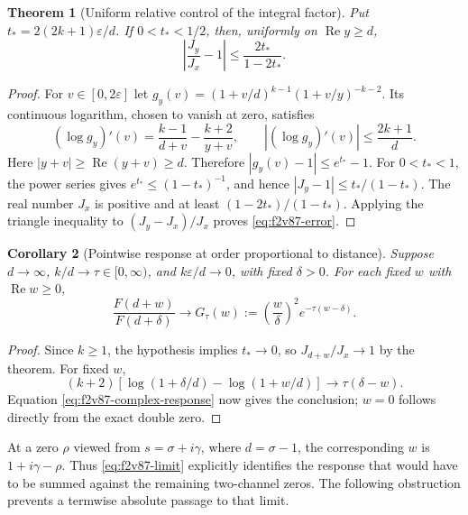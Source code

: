 \documentclass[11pt]{article}
\newtheorem{theorem}{Theorem}[section]
\newtheorem{corollary}[theorem]{Corollary}
\theoremstyle{definition}
\theoremstyle{remark}
\begin{document}
\begin{theorem}[Uniform relative control of the integral factor]
\label{thm:f2v87-uniform}
Put \(t_*=2(2k+1)\varepsilon/d\).  If \(0<t_*<1/2\), then,
uniformly on \(\operatorname{Re}y\ge d\),
\begin{equation}
 \left|\frac{J_y}{J_x}-1\right|
 \le\frac{2t_*}{1-2t_*}.
 \label{eq:f2v87-error}
\end{equation}
\end{theorem}

\begin{proof}
For \(v\in[0,2\varepsilon]\) let
\(g_y(v)=(1+v/d)^{k-1}(1+v/y)^{-k-2}\).  Its continuous logarithm,
chosen to vanish at zero, satisfies
\[
 (\log g_y)'(v)=\frac{k-1}{d+v}-\frac{k+2}{y+v},\qquad
 |(\log g_y)'(v)|\le\frac{2k+1}{d}.
\]
Here \(|y+v|\ge\operatorname{Re}(y+v)\ge d\).
Therefore \(|g_y(v)-1|\le e^{t_*}-1\).  For \(0<t_*<1\), the
power series gives \(e^{t_*}\le(1-t_*)^{-1}\), and hence
\( |J_y-1|\le t_* /(1-t_*)\).  The real number \(J_x\) is
positive and at least \((1-2t_*)/(1-t_*)\).  Applying the triangle
inequality to \((J_y-J_x)/J_x\) proves \eqref{eq:f2v87-error}.
\end{proof}

\begin{corollary}[Pointwise response at order proportional to distance]
\label{cor:f2v87-limit}
Suppose \(d\to\infty\), \(k/d\to\tau\in[0,\infty)\), and
\(k\varepsilon/d\to0\), with fixed \(\delta>0\).  For each fixed
\(w\) with \(\operatorname{Re}w\ge0\),
\begin{equation}
 \frac{F(d+w)}{F(d+\delta)}
 \longrightarrow
 G_\tau(w):=\left(\frac w\delta\right)^2
                 e^{-\tau(w-\delta)}.
 \label{eq:f2v87-limit}
\end{equation}
\end{corollary}

\begin{proof}
Since \(k\ge1\), the hypothesis implies \(t_*\to0\), so
\(J_{d+w}/J_x\to1\) by the theorem.  For fixed \(w\),
\[
 (k+2)\left[\log(1+\delta/d)-\log(1+w/d)\right]
 \longrightarrow\tau(\delta-w).
\]
Equation \eqref{eq:f2v87-complex-response} now gives the conclusion;
\(w=0\) follows directly from the exact double zero.
\end{proof}

At a zero \(\rho\) viewed from \(s=\sigma+i\gamma\), where
\(d=\sigma-1\), the corresponding \(w\) is
\(1+i\gamma-\rho\).  Thus \eqref{eq:f2v87-limit} explicitly
identifies the response that would have to be summed against the
remaining two-channel zeros.  The following obstruction prevents a
termwise absolute passage to that limit.
\end{document}
